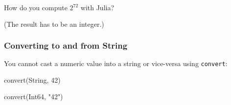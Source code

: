 \documentclass[english,serif,mathserif,xcolor=pdftex,dvipsnames,table]{beamer}
\begin{document}
\begin{frame}
  \begin{exercise*}[1.B]
    How do you compute $2^{72}$ with Julia?

    (The result has to be an integer.)
  \end{exercise*}
\end{frame}











\begin{frame}[fragile]
  \frametitle{Converting to and from String}
  You cannot cast a numeric value into a string or vice-versa using \texttt{convert}:
\begin{semiverbatim}\smaller
\julia convert(String, 42)

\julia convert(Int64, "42")
\end{semiverbatim}
\end{frame}
\end{document}
